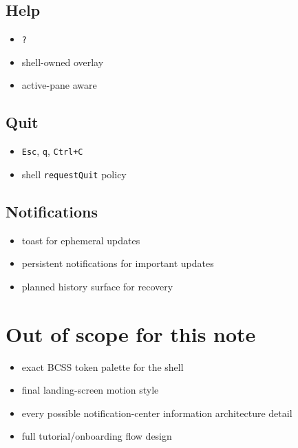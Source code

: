 \subsection{Help}\label{record-047-help-1}

\begin{itemize}
\tightlist
\item
  \texttt{?}
\item
  shell-owned overlay
\item
  active-pane aware
\end{itemize}

\subsection{Quit}\label{record-047-quit}

\begin{itemize}
\tightlist
\item
  \texttt{E\allowbreak{}s\allowbreak{}c}, \texttt{q}, \texttt{C\allowbreak{}t\allowbreak{}r\allowbreak{}l\allowbreak{}+\allowbreak{}C}
\item
  shell \texttt{r\allowbreak{}e\allowbreak{}q\allowbreak{}u\allowbreak{}e\allowbreak{}s\allowbreak{}t\allowbreak{}Q\allowbreak{}u\allowbreak{}i\allowbreak{}t} policy
\end{itemize}

\subsection{Notifications}\label{record-047-notifications}

\begin{itemize}
\tightlist
\item
  toast for ephemeral updates
\item
  persistent notifications for important updates
\item
  planned history surface for recovery
\end{itemize}

\section{Out of scope for this note}\label{record-047-out-of-scope-for-this-note}

\begin{itemize}
\tightlist
\item
  exact BCSS token palette for the shell
\item
  final landing-screen motion style
\item
  every possible notification-center information architecture detail
\item
  full tutorial/onboarding flow design
\end{itemize}

